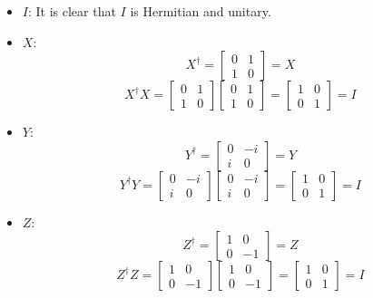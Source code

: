 \documentclass{homeworg}
\begin{document}
\exercise*
\begin{itemize}
    \item $I$: It is clear that $I$ is Hermitian and unitary.
   \item $X$:
   \[X^\dagger=\begin{bmatrix} 0 & 1 \\ 1 & 0 \end{bmatrix}=X\]
   \[X^\dagger X=\begin{bmatrix} 0 & 1 \\ 1 & 0 \end{bmatrix}\begin{bmatrix} 0 & 1 \\ 1 & 0 \end{bmatrix}=\begin{bmatrix} 1 & 0 \\ 0 & 1 \end{bmatrix}=I\]
   \item $Y$:
   \[Y^\dagger=\begin{bmatrix} 0 & -i \\ i & 0 \end{bmatrix}=Y\]
   \[Y^\dagger Y=\begin{bmatrix} 0 & -i \\ i & 0 \end{bmatrix}\begin{bmatrix} 0 & -i \\ i & 0 \end{bmatrix}=\begin{bmatrix} 1 & 0 \\ 0 & 1 \end{bmatrix}=I\]
   \item $Z$:
   \[Z^\dagger=\begin{bmatrix} 1 & 0 \\ 0 & -1 \end{bmatrix}=Z\]
   \[Z^\dagger Z=\begin{bmatrix} 1 & 0 \\ 0 & -1 \end{bmatrix}\begin{bmatrix} 1 & 0 \\ 0 & -1 \end{bmatrix}=\begin{bmatrix} 1 & 0 \\ 0 & 1 \end{bmatrix}=I\]
\end{itemize}

\exercise*
\end{document}
